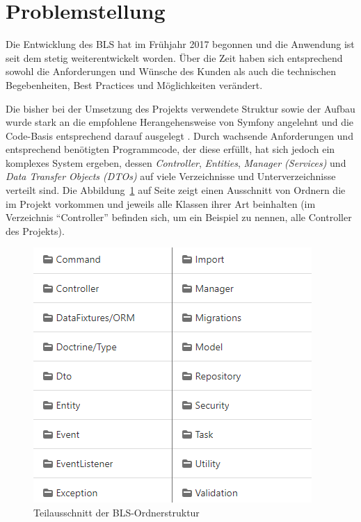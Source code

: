 \documentclass[a4paper,12pt,twoside]{scrreprt}
\begin{document}
\section{Problemstellung}
\label{sec:problemstellung}
Die Entwicklung des BLS hat im Frühjahr 2017 begonnen und die Anwendung ist seit dem stetig weiterentwickelt worden. Über die Zeit haben sich entsprechend sowohl die Anforderungen und Wünsche des Kunden als auch die technischen Begebenheiten, Best Practices und Möglichkeiten verändert.

Die bisher bei der Umsetzung des Projekts verwendete Struktur sowie der Aufbau wurde stark an die empfohlene Herangehensweise von Symfony angelehnt und die Code-Basis entsprechend darauf ausgelegt \parencite[siehe dazu][\enquote{Use the Default Directory Structure}]{symfony_symfony_2020}. Durch wachsende Anforderungen und entsprechend benötigten Programmcode, der diese erfüllt, hat sich jedoch ein komplexes System ergeben, dessen \textit{Controller}, \textit{Entities}, \textit{Manager (Services)} und \textit{Data Transfer Objects (DTOs)} auf viele Verzeichnisse und Unterverzeichnisse verteilt sind. Die Abbildung~\ref{fig:ordnerstruktur} auf Seite \pageref{fig:ordnerstruktur} zeigt einen Ausschnitt von Ordnern die im Projekt vorkommen und jeweils alle Klassen ihrer Art beinhalten (im Verzeichnis \enquote{Controller} befinden sich, um ein Beispiel zu nennen, alle Controller des Projekts).

\begin{figure}[ht]
    \centering
    \includegraphics[scale=0.75]{images/bls_folder_structure.png}
    \caption{Teilausschnitt der BLS-Ordnerstruktur}
    \label{fig:ordnerstruktur}
\end{figure}
\end{document}

